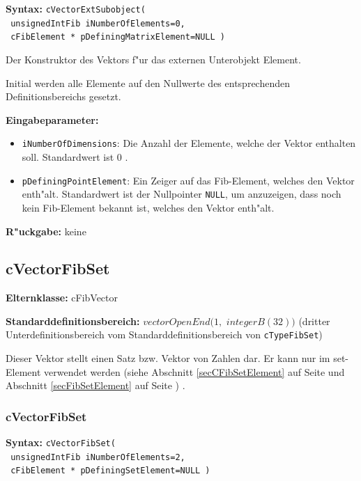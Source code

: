 \textbf{Syntax:} \verb|cVectorExtSubobject(| \\\verb| unsignedIntFib iNumberOfElements=0,| \\\verb| cFibElement * pDefiningMatrixElement=NULL )|

\bigskip\noindent
Der Konstruktor des Vektors f"ur das externen Unterobjekt Element.

Initial werden alle Elemente auf den Nullwerte des entsprechenden Definitionsbereichs gesetzt.

\bigskip\noindent
\textbf{Eingabeparameter:}
\begin{itemize}
 \item \verb|iNumberOfDimensions|: Die Anzahl der Elemente, welche der Vektor enthalten soll. Standardwert ist $0$ .
 \item \verb|pDefiningPointElement|: Ein Zeiger auf das Fib-Element, welches den Vektor enth"alt. Standardwert ist der Nullpointer \verb|NULL|, um anzuzeigen, dass noch kein Fib-Element bekannt ist, welches den Vektor enth"alt.
\end{itemize}

\bigskip\noindent
\textbf{R"uckgabe:} keine


\subsection{cVectorFibSet}

\bigskip\noindent
\textbf{Elternklasse:} cFibVector

\bigskip\noindent
\textbf{Standarddefinitionsbereich:} $vectorOpenEnd( 1,$ $integerB(32) )$ (dritter Unterdefinitionsbereich vom Standarddefinitionsbereich von \verb|cTypeFibSet|)

\bigskip\noindent
Dieser Vektor stellt einen Satz bzw. Vektor von Zahlen dar. Er kann nur im set-Element verwendet werden (siehe Abschnitt \ref{secCFibSetElement} auf Seite \pageref{secCFibSetElement} und Abschnitt \ref{secFibSetElement} auf Seite \pageref{secFibSetElement} ) .


\subsubsection{cVectorFibSet}

\textbf{Syntax:} \verb|cVectorFibSet(| \\\verb| unsignedIntFib iNumberOfElements=2,| \\\verb| cFibElement * pDefiningSetElement=NULL )|

